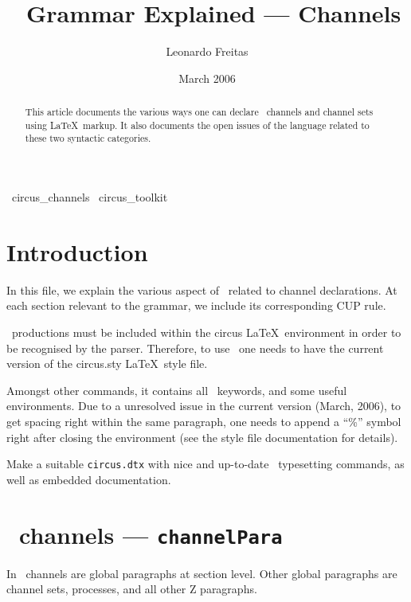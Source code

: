 \documentclass{article}
\newcommand{\grammar}[1]{\texttt{#1}}
\begin{document}
\title{\Circus\ Grammar Explained --- Channels}
\author{Leonardo Freitas}
\date{March 2006}

\maketitle

\begin{abstract}
    \noindent This article documents the various ways one can declare \Circus\ channels and channel sets
    using \LaTeX\ markup.  It also documents the open issues of the language related to these two syntactic
    categories.
\end{abstract}

\begin{zsection}
  \SECTION\ circus\_channels \parents\ circus\_toolkit
\end{zsection}

\section{Introduction}

In this file, we explain the various aspect of \Circus\ related to channel
declarations. At each section relevant to the grammar, we include its
corresponding CUP rule.

\Circus\ productions must be included within the \textsf{circus} \LaTeX\
environment in order to be recognised by the parser. Therefore, to use \Circus\
one needs to have the current version of the \textsf{circus.sty} \LaTeX\ style
file.

Amongst other commands, it contains all \Circus\ keywords, and some useful
environments. Due to a unresolved issue in the current version (March, 2006),
to get spacing right within the same paragraph, one needs to append a ``\%''
symbol right after closing the environment (see the style file documentation
for details).

\begin{issue}
   Make a suitable \texttt{circus.dtx} with nice and up-to-date \Circus\
   typesetting commands, as well as embedded documentation.
\end{issue}

\section{\Circus\ channels --- \grammar{channelPara}}

In \Circus\ channels are global paragraphs at section level. Other global
paragraphs are channel sets, processes, and all other Z paragraphs.
\end{document}
